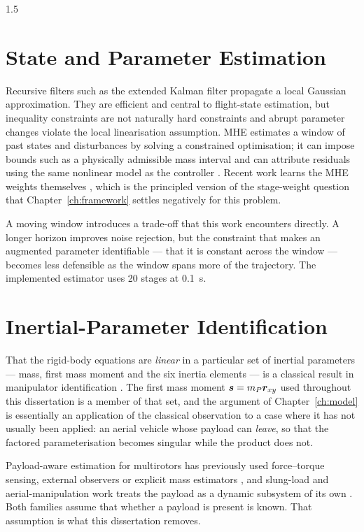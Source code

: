 \begin{spacing}{1.5}
\section{State and Parameter Estimation}

Recursive filters such as the extended Kalman filter propagate a local Gaussian
approximation. They are efficient and central to flight-state estimation, but
inequality constraints are not naturally hard constraints and abrupt parameter
changes violate the local linearisation assumption. MHE estimates a window of
past states and disturbances by solving a constrained optimisation; it can impose
bounds such as a physically admissible mass interval and can attribute residuals
using the same nonlinear model as the controller
\cite{rawlings2017mpc,rao2003mhe,rao2003}. Recent work learns the MHE weights
themselves \cite{neuromhe}, which is the principled version of the stage-weight
question that Chapter~\ref{ch:framework} settles negatively for this problem.

A moving window introduces a trade-off that this work encounters directly. A
longer horizon improves noise rejection, but the constraint that makes an
augmented parameter identifiable --- that it is constant across the window ---
becomes less defensible as the window spans more of the trajectory. The
implemented estimator uses 20 stages at \SI{0.1}{\second}.

\section{Inertial-Parameter Identification}

That the rigid-body equations are \emph{linear} in a particular set of inertial
parameters --- mass, first mass moment and the six inertia elements --- is a
classical result in manipulator identification \cite{atkeson1986}. The first mass
moment $\bm{s} = m_P\bm r_{xy}$ used throughout this dissertation is a member of
that set, and the argument of Chapter~\ref{ch:model} is essentially an
application of the classical observation to a case where it has not usually been
applied: an aerial vehicle whose payload can \emph{leave}, so that the factored
parameterisation becomes singular while the product does not.

Payload-aware estimation for multirotors has previously used force--torque
sensing, external observers or explicit mass estimators \cite{tomic2017,
svacha2020, wuest2019, bohm2021}, and slung-load and aerial-manipulation work
treats the payload as a dynamic subsystem of its own \cite{sreenath2013,
thomas2014, ollero2022}. Both families assume that whether a payload is present
is known. That assumption is what this dissertation removes.


\end{spacing}
